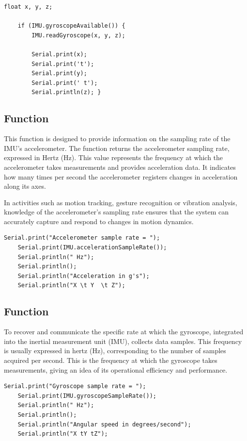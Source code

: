 \begin{lstlisting}[style=Arduino]
	float x, y, z;
	
	if (IMU.gyroscopeAvailable()) {
		IMU.readGyroscope(x, y, z);
		
		Serial.print(x);
		Serial.print('t');
		Serial.print(y);
		Serial.print(' t');
		Serial.println(z); }
\end{lstlisting}


\subsection{Function }

This function is designed to provide information on the sampling rate of the IMU's accelerometer. The function  returns the accelerometer sampling rate, expressed in Hertz (Hz). This value represents the frequency at which the accelerometer takes measurements and provides acceleration data. It indicates how many times per second the accelerometer registers changes in acceleration along its axes. \cite{STMicroelectronics_LSM9DS1:2024}

In activities such as motion tracking, gesture recognition or vibration analysis, knowledge of the accelerometer's sampling rate ensures that the system can accurately capture and respond to changes in motion dynamics. 

\begin{lstlisting}[style=Arduino]
	Serial.print("Accelerometer sample rate = ");
	Serial.print(IMU.accelerationSampleRate());
	Serial.println(" Hz");
	Serial.println();
	Serial.println("Acceleration in g's");
	Serial.println("X \t Y  \t Z");
\end{lstlisting}



\subsection{Function }

To recover and communicate the specific rate at which the gyroscope, integrated into the inertial measurement unit (IMU), collects data samples. This frequency is usually expressed in hertz (Hz), corresponding to the number of samples acquired per second. This is the frequency at which the gyroscope takes measurements, giving an idea of its operational efficiency and performance. \cite{STMicroelectronics_LSM9DS1:2024}

\begin{lstlisting}[style=Arduino]
	Serial.print("Gyroscope sample rate = ");
	Serial.print(IMU.gyroscopeSampleRate());
	Serial.println(" Hz");
	Serial.println();
	Serial.println("Angular speed in degrees/second");
	Serial.println("X tY tZ");
	
\end{lstlisting}

